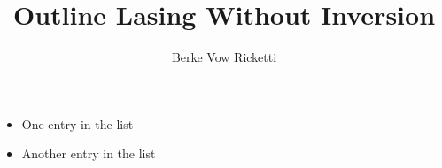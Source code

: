 \documentclass{article}
\title{Outline Lasing Without Inversion}
\author{Berke Vow Ricketti}
\begin{document}
\maketitle{}




\section{}

\begin{itemize}
  \item One entry in the list
  \item Another entry in the list
\end{itemize}
\end{document}
